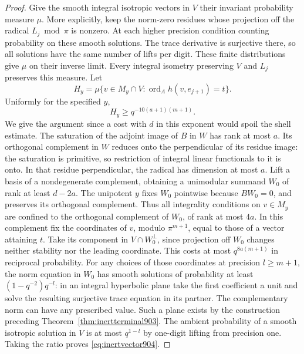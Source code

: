 \documentclass[a4paper,11pt]{article}
\theoremstyle{definition}
\theoremstyle{remark}
\numberwithin{equation}{section}
\begin{document}
\begin{proof}
Give the smooth integral isotropic vectors in \(V\) their
invariant probability measure \(\mu\). More explicitly, keep
the norm-zero residues whose projection off the radical
\(L_j\bmod\pi\) is nonzero. At each higher precision condition
counting probability on these smooth solutions. The trace
derivative is surjective there, so all solutions have the
same number of lifts per digit. These finite distributions
give \(\mu\) on their inverse limit. Every integral isometry
preserving \(V\) and \(L_j\) preserves this measure. Let
\[
    H_y=\mu\{v\in M_y\cap V:
                    \operatorname{ord}_A h(v,e_{j+1})=t\}.
\]
Uniformly for the specified \(y\),
\begin{equation}
                   H_y\ge q^{-10(a+1)(m+1)} .
 \label{eq:inertvector904}
\end{equation}
We give the argument since a cost with \(d\) in this exponent
would spoil the shell estimate. The saturation of the adjoint
image of \(B\) in \(W\) has rank at most \(a\). Its orthogonal
complement in \(W\) reduces onto the perpendicular of its
residue image: the saturation is primitive, so restriction of
integral linear functionals to it is onto. In that residue
perpendicular, the radical has dimension at most \(a\).
Lift a basis of a nondegenerate complement, obtaining a
unimodular summand \(W_0\) of rank at least \(d-2a\).
The unipotent \(y\) fixes \(W_0\) pointwise because \(B W_0=0\),
and preserves its orthogonal complement. Thus all integrality
conditions on \(v\in M_y\) are confined to the orthogonal
complement of \(W_0\), of rank at most \(4a\).
In this complement fix the coordinates of \(v\), modulo
\(\pi^{m+1}\), equal to those of a vector attaining \(t\).
Take its component in \(V\cap W_0^\perp\), since projection
off \(W_0\) changes neither stability nor the leading coordinate.
This costs at most \(q^{8a(m+1)}\) in reciprocal probability.
For any choices of those coordinates at precision \(l\ge m+1\),
the norm equation in \(W_0\) has smooth solutions of probability
at least \((1-q^{-2})q^{-l}\): in an integral hyperbolic plane
take the first coefficient a unit and solve the resulting
surjective trace equation in its partner. The complementary
norm can have any prescribed value. Such a plane exists by the
construction preceding Theorem~\ref{thm:inertterminal903}.
The ambient probability of a smooth isotropic solution in \(V\)
is at most \(q^{1-l}\) by one-digit lifting from precision one.
Taking the ratio proves \eqref{eq:inertvector904}.


\end{proof}
\end{document}
